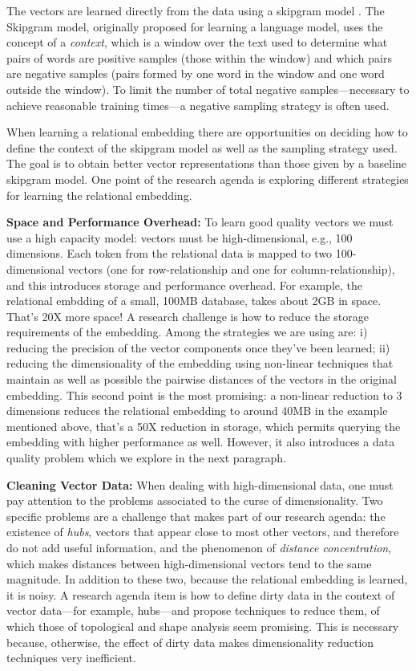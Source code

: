 The vectors are learned directly from the data using a skipgram model
\cite{skipgram}. The Skipgram model, originally proposed for learning a language
model, uses the concept of a \emph{context}, which is a window over the text
used to determine what pairs of words are positive samples (those within the
window) and which pairs are negative samples (pairs formed by one word in the
window and one word outside the window). To limit the number of total negative
samples---necessary to achieve reasonable training times---a negative sampling
strategy is often used.

When learning a relational embedding there are opportunities on deciding how to
define the context of the skipgram model as well as the sampling strategy used.
The goal is to obtain better vector representations than those given by a
baseline skipgram model. One point of the research agenda is exploring
different strategies for learning the relational embedding.

\noindent\textbf{Space and Performance Overhead: }To learn good quality vectors we must
use a high capacity model: vectors must be high-dimensional, e.g., 100 dimensions.
Each token from the relational data is mapped to two 100-dimensional vectors
(one for row-relationship and one for column-relationship), and this introduces
storage and performance overhead. For example, the relational embdding of a
small, 100MB database, takes about 2GB in space. That's 20X more space! A
research challenge is how to reduce the storage requirements of the embedding. Among
the strategies we are using are: i) reducing the precision of the vector
components once they've been learned; ii) reducing the dimensionality of the
embedding using non-linear techniques \cite{tsne} that maintain as well as possible the
pairwise distances of the vectors in the original embedding. This second point
is the most promising: a non-linear reduction to 3 dimensions reduces the
relational embedding to around 40MB in the example mentioned above, that's a 50X
reduction in storage, which permits querying the embedding with higher
performance as well. However, it also introduces a data quality problem which we
explore in the next paragraph.

\noindent\textbf{Cleaning Vector Data: }When dealing with high-dimensional data, one must
pay attention to the problems associated to the curse of dimensionality. Two
specific problems are a challenge that makes part of our research agenda: the
existence of \emph{hubs}, vectors that appear close to most other vectors, and
therefore do not add useful information, and the phenomenon of \emph{distance
concentration}, which makes distances between high-dimensional vectors tend to
the same magnitude. In addition to these two, because the relational embedding
is learned, it is noisy. A research agenda item is how to define dirty data in
the context of vector data---for example, hubs---and propose techniques to
reduce them, of which those of topological and shape analysis seem promising.
This is necessary because, otherwise, the effect of dirty data makes
dimensionality reduction techniques very inefficient.

